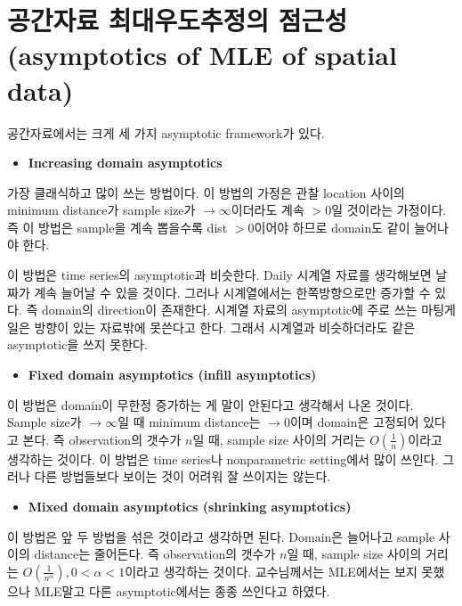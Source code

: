 \documentclass[b5paper,]{scrbook}
\providecommand{\tightlist}{%
  \setlength{\itemsep}{0pt}\setlength{\parskip}{0pt}}
\theoremstyle{plain}
\theoremstyle{definition}
\numberwithin{equation}{section}
\begin{document}
\section{공간자료 최대우도추정의 점근성(asymptotics of MLE of spatial
data)}\label{--asymptotics-of-mle-of-spatial-data}

공간자료에서는 크게 세 가지 asymptotic framework가 있다.

\begin{itemize}
\tightlist
\item
  \textbf{Increasing domain asymptotics}
\end{itemize}

가장 클래식하고 많이 쓰는 방법이다. 이 방법의 가정은 관찰 location
사이의 minimum distance가 sample size가 \(\rightarrow \infty\)이더라도
계속 \(>0\)일 것이라는 가정이다. 즉 이 방법은 sample을 계속 뽑을수록
dist \(>0\)이어야 하므로 domain도 같이 늘어나야 한다.

이 방법은 time series의 asymptotic과 비슷한다. Daily 시계열 자료를
생각해보면 날짜가 계속 늘어날 수 있을 것이다. 그러나 시계열에서는
한쪽방향으로만 증가할 수 있다. 즉 domain의 direction이 존재한다. 시계열
자료의 asymptotic에 주로 쓰는 마팅게일은 방향이 있는 자료밖에 못쓴다고
한다. 그래서 시계열과 비슷하더라도 같은 asymptotic을 쓰지 못한다.

\begin{itemize}
\tightlist
\item
  \textbf{Fixed domain asymptotics (infill asymptotics)}
\end{itemize}

이 방법은 domain이 무한정 증가하는 게 말이 안된다고 생각해서 나온
것이다. Sample size가 \(\rightarrow \infty\)일 때 minimum distance는
\(\rightarrow 0\)이며 domain은 고정되어 있다고 본다. 즉 observation의
갯수가 \(n\)일 때, sample size 사이의 거리는 \(O(\frac{1}{n})\)이라고
생각하는 것이다. 이 방법은 time series나 nonparametric setting에서 많이
쓰인다. 그러나 다른 방법들보다 보이는 것이 어려워 잘 쓰이지는 않는다.

\begin{itemize}
\tightlist
\item
  \textbf{Mixed domain asymptotics (shrinking asymptotics)}
\end{itemize}

이 방법은 앞 두 방법을 섞은 것이라고 생각하면 된다. Domain은 늘어나고
sample 사이의 distance는 줄어든다. 즉 observation의 갯수가 \(n\)일 때,
sample size 사이의 거리는
\(O(\frac{1}{n^{\alpha}}), 0 <\alpha <1\)이라고 생각하는 것이다.
교수님께서는 MLE에서는 보지 못했으나 MLE말고 다른 asymptotic에서는 종종
쓰인다고 하였다.
\end{document}
